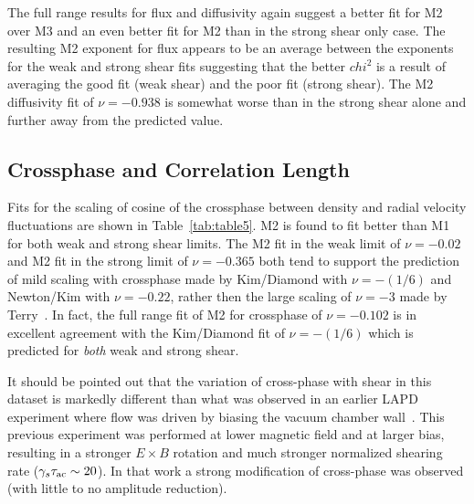 \documentclass[aip,pop,amsmath,amssymb,peprint,superscriptaddress]{revtex4-1} %
\begin{document}
The full range results for flux and diffusivity again suggest a better fit for M2 over M3 and an even better fit for M2 than in the strong shear only case. The resulting M2 exponent for flux appears to be an average between the exponents for the weak and strong shear fits suggesting that the better $chi^{2}$ is a result of averaging the good fit (weak shear) and the poor fit (strong shear). The M2 diffusivity fit of $\nu = -0.938$ is somewhat worse than in the strong shear alone and further away from the predicted value.

\subsection{Crossphase and Correlation Length}

Fits for the scaling of cosine of the crossphase between density and radial velocity fluctuations are shown in Table~\ref{tab:table5}. M2 is found to fit better than M1 for both weak and strong shear limits. The M2 fit in the weak limit of $\nu = -0.02$ and M2 fit in the strong limit of $\nu = -0.365$ both tend to support the prediction of mild scaling with crossphase made by Kim/Diamond with $\nu = -(1/6)$ and Newton/Kim with $\nu = -0.22$, rather then the large scaling of $\nu = -3$ made by Terry~\cite{terry01}. In fact, the full range fit of M2 for crossphase of $\nu = -0.102$ is in excellent agreement with the Kim/Diamond fit of $\nu = -(1/6)$ which is predicted for \textit{both} weak and strong shear.

It should be pointed out that the variation of cross-phase with shear
in this dataset is markedly different than what was observed in an
earlier LAPD experiment where flow was driven by biasing the vacuum
chamber wall~\cite{carter09}.  This previous experiment was performed
at lower magnetic field and at larger bias, resulting in a stronger
$E\times B$ rotation and much stronger normalized shearing rate ($\gamma_s\tau_{\rm ac} \sim 20$).  In that work a strong modification of cross-phase was observed (with little to no amplitude reduction).  
\end{document}
